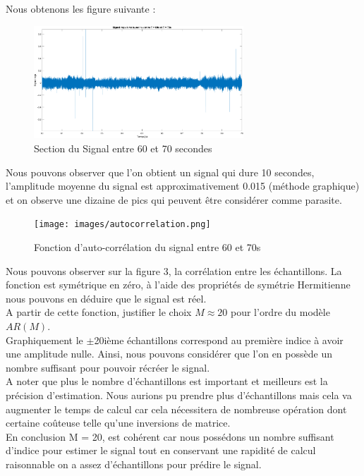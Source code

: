 \documentclass{article}
\begin{document}
Nous obtenons les figure suivante : 
\begin{figure}[!h] 	
    \centering
    \includegraphics[width=0.7\textwidth]{images/signaloriginecourt.png}
    \caption{Section du Signal entre 60 et 70 secondes}
    \label{fig-binaire}
\end{figure}
Nous pouvons observer que l'on obtient un signal qui dure 10 secondes, l'amplitude moyenne du signal est approximativement 0.015 (méthode graphique) et on observe une dizaine de pics qui peuvent être considérer comme parasite. \\

\clearpage
\begin{figure}[!h]
    \centering
    \texttt{[image: images/autocorrelation.png]}
    \caption{Fonction d'auto-corrélation du signal entre 60 et 70s}
    \label{fig-binaire}
\end{figure}
Nous pouvons observer sur la figure 3, la corrélation entre les échantillons. La fonction est symétrique en zéro, à l'aide des propriétés de symétrie Hermitienne nous pouvons en déduire que le signal est réel. \\
\newline
A partir de cette fonction, justifier le choix $M \approx 20$ pour l'ordre du modèle $AR(M)$.\\
\newline
Graphiquement le $\pm$20ième échantillons correspond au première indice à avoir une amplitude nulle. Ainsi, nous pouvons considérer que l'on en possède un nombre suffisant pour pouvoir récréer le signal. \\
A noter que plus le nombre d'échantillons est important et meilleurs est la précision d'estimation. Nous aurions pu prendre plus d'échantillons mais cela va augmenter le temps de calcul car cela nécessitera de nombreuse opération dont certaine coûteuse telle qu'une inversions de matrice. \\
En conclusion M = 20, est cohérent car nous possédons un nombre suffisant d'indice pour estimer le signal tout en conservant une rapidité de calcul raisonnable on a assez d’échantillons pour prédire le signal. 
\end{document}
